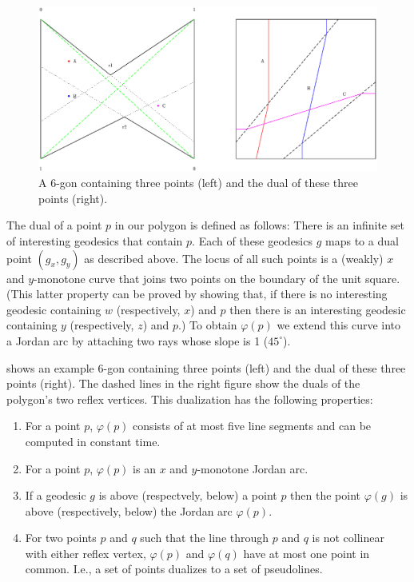 \documentclass[charterfonts,lotsofwhite]{patmorin}
\newcommand{\dual}[1]{\varphi(#1)}
\begin{document}
\begin{figure}[htbp]
\begin{center}\includegraphics{dual}\end{center}
\caption{A 6-gon containing three points (left) and the dual of these
three points (right).}
\end{figure}

The dual of a point $p$ in our polygon is defined as follows:  There
is an infinite set of interesting geodesics that contain $p$.  Each of
these geodesics $g$ maps to a dual point $(g_x,g_y)$ as described
above.  The locus of all such points is a (weakly) $x$ and
$y$-monotone curve that joins two points on the boundary of the unit
square. (This latter property can be proved by showing that, if there
is no interesting geodesic containing $w$ (respectively, $x$) and $p$
then there is an interesting geodesic containing $y$ (respectively,
$z$) and $p$.) To obtain $\dual{p}$ we extend this curve into a Jordan
arc by attaching two rays whose slope is 1 ($45^\circ$).

 shows an example 6-gon containing three points
(left) and the dual of these three points (right).  The dashed lines
in the right figure show the duals of the polygon's two reflex
vertices.  This dualization has the following properties:
\begin{enumerate}
\item For a point $p$, $\dual{p}$ consists of at most five line
segments and can be computed in constant time.

\item For a point $p$, $\dual{p}$ is an $x$ and $y$-monotone Jordan
arc. 

\item If a geodesic $g$ is above (respectvely, below) a point $p$ then
the point $\dual{g}$ is above (respectively, below) the Jordan arc
$\dual{p}$.

\item For two points $p$ and $q$ such that the line through $p$ and
$q$ is not collinear with either reflex vertex, $\dual{p}$ and
$\dual{q}$ have at most one point in common.  I.e., a set of
points dualizes to a set of pseudolines.

\end{enumerate}
\end{document}
